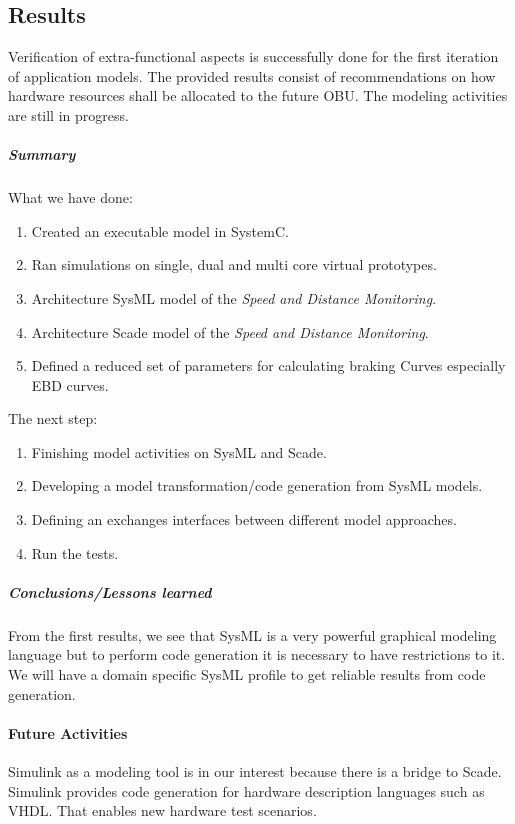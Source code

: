 \subsection{Results}

Verification of extra-functional aspects is successfully done for the first iteration of application models. The provided results consist of recommendations on how hardware resources shall be allocated to the future OBU. The modeling activities are still in progress.

\subparagraph{Summary}

What we have done:
\begin{enumerate}
\item Created an executable model in SystemC.
\item Ran simulations on single, dual and multi core virtual prototypes.
\item Architecture SysML model of the \emph{Speed and Distance Monitoring}.
\item Architecture Scade model of the \emph{Speed and Distance Monitoring}.
\item Defined a reduced set of parameters for calculating braking Curves especially EBD curves.
\end{enumerate}
 
 The next step:
 \begin{enumerate}
 \item Finishing model activities on SysML and Scade.
 \item Developing a model transformation/code generation from SysML models.
 \item Defining an exchanges interfaces between different model approaches.
 \item Run the tests.
 \end{enumerate}
\subparagraph{Conclusions/Lessons learned}
From the first results, we see that SysML is a very powerful graphical modeling language but to perform code generation it is necessary to have restrictions to it. We will have a domain specific SysML profile to get reliable results from code generation.  


\paragraph{Future Activities}
Simulink as a modeling tool is in our interest because there is a bridge to Scade. Simulink provides code generation for hardware description languages such as VHDL. That enables new hardware test scenarios.
